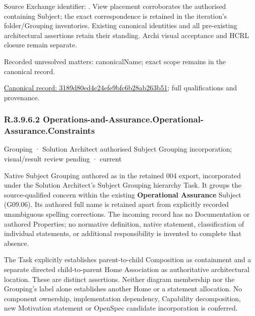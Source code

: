 Source Exchange identifier: \texttt{}. View placement corroborates
the authorised containing Subject; the exact correspondence is retained in the
iteration's folder/Grouping inventories. Existing canonical identities and all
pre-existing architectural assertions retain their standing. Archi visual
acceptance and HCRL closure remain separate.


{\small Recorded unresolved matters: canonicalName; exact scope remains in the canonical record.}\par
{\footnotesize \href{../../../../continuum/grouping/3189d80ed4c24efe9bfc6b28ab263b51.md}{Canonical record: 3189d80ed4c24efe9bfc6b28ab263b51}; full qualifications and provenance.}\par
\subsubsection*{R.3.9.6.2 Operations-and-Assurance.Operational-Assurance.Constraints}
\label{navigation:R.3.9.6.2}

\label{element:793ed649804a4bf19b5fa92bac3e4c29}
{\small Grouping · Solution Architect authorised Subject Grouping incorporation; visual/result review pending · current}\par

Native Subject Grouping authored as \texttt{} in the retained 004 export,
incorporated under the Solution Architect's Subject Grouping hierarchy Task.
It groups the source-qualified \texttt{} concern within
the existing \textbf{Operational Assurance} Subject (G09.06). Its authored full name
is retained apart from explicitly recorded unambiguous spelling corrections.
The incoming record has no Documentation or authored Properties; no normative
definition, native statement, classification of individual statements, or
additional responsibility is invented to complete that absence.



The Task explicitly establishes parent-to-child Composition as containment and
a separate directed child-to-parent Home Association as authoritative architectural
location. These are distinct assertions. Neither diagram membership nor the
Grouping's label alone establishes another Home or a statement allocation.
No component ownership, implementation dependency, Capability decomposition,
new Motivation statement or OpenSpec candidate incorporation is conferred.



